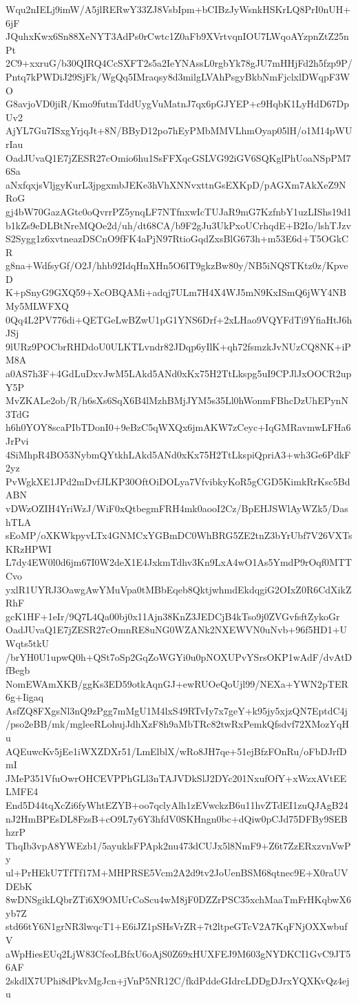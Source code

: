 Wqu2nIELj9imW/A5jlRERwY33ZJ8VsbIpm+bCIBzJyWsnkHSKrLQ8PrI0nUH+6jF
JQuhxKwx6Sn88XeNYT3AdPs0rCwtc1Z0aFb9XVrtvqnIOU7LWqoAYzpnZtZ25nPt
2C9+xxruG/b30QIRQ4CcSXFT2s5a2IeYNAssL0rgbYk78gJU7mHHjFd2h5fzp9P/
Pntq7kPWDiJ29SjFk/WgQq5IMraqsy8d3milgLVAhPsgyBkbNmFjclxlDWqpF3WO
G8avjoVD0jiR/Kmo9futmTddUygVuMatnJ7qx6pGJYEP+c9HqbK1LyHdD67DpUv2
AjYL7Gu7ISxgYrjqJt+8N/BByD12po7hEyPMbMMVLhmOyap05lH/o1M14pWUrIau
OadJUvaQ1E7jZESR27cOmio6hu1SsFFXqcGSLVG92iGV6SQKglPhUoaNSpPM76Sa
aNxfqxjsVljgyKurL3jpgxmbJEKe3hVhXNNvxttnGsEXKpD/pAGXm7AkXeZ9NRoG
gj4bW70GazAGtc0oQvrrPZ5ynqLF7NTfnxwIcTUJaR9mG7KzfnbY1uzLIShs19d1
b1kZs9eDLBtNreMQOe2d/uh/dt68CA/b9F2gJu3UkPxoUCrhqdE+B2Io/lshTJzv
S2Sygg1z6xvtneazDSCnO9fFK4aPjN97RtioGqdZxsBlG673h+m53E6d+T5OGkCR
g8na+WdfsyGf/O2J/hhb92IdqHnXHn5O6IT9gkzBw80y/NB5iNQSTKtz0z/KpveD
K+pSnyG9GXQ59+XcOBQAMi+adqj7ULm7H4X4WJ5mN9KxISmQ6jWY4NBMy5MLWFXQ
0Qq4L2PV776di+QETGeLwBZwU1pG1YNS6Drf+2xLHao9VQYFdTi9YfiaHtJ6hJSj
9lURz9POCbrRHDdoU0ULKTLvndr82JDqp6yIlK+qh72fsmzkJvNUzCQ8NK+iPM8A
a0AS7h3F+4GdLuDxvJwM5LAkd5ANd0xKx75H2TtLkspg5uI9CPJlJxOOCR2upY5P
MvZKALe2ob/R/h6sXs6SqX6B4lMzhBMjJYM5s35Ll0hWonmFBhcDzUhEPynN3TdG
h6h0YOY8scaPIbTDonI0+9eBzC5qWXQx6jmAKW7zCeyc+IqGMRavmwLFHa6JrPvi
4SiMhpR4BO53NybmQYtkhLAkd5ANd0xKx75H2TtLkspiQpriA3+wh3Ge6PdkF2yz
PvWgkXE1JPd2mDvfJLKP30OftOiDOLya7VfvibkyKoR5gCGD5KimkRrKsc5BdABN
vDWzOZIH4YriWzJ/WiF0xQtbegmFRH4mk0aooI2Cz/BpEHJSWlAyWZk5/DashTLA
sEoMP/oXKWkpyvLTx4GNMCxYGBmDC0WhBRG5ZE2tnZ3bYrUbf7V26VXTsKRzHPWI
L7dy4EW0l0d6jm67I0W2deX1E4JxkmTdhv3Kn9LxA4wO1As5YmdP9rOqf0MTTCvo
yxlR1UYRJ3OawgAwYMuVpa0tMBbEqeb8QktjwhmdEkdqgiG2OIxZ0R6CdXikZRhF
gcK1HF+1eIr/9Q7L4Qa00bj0x11Ajn38KnZ3JEDCjB4kTso9j0ZVGvfsftZykoGr
OadJUvaQ1E7jZESR27cOmnRE8uNG0WZANk2NXEWVN0uNvb+96f5HD1+UWqts5tkU
/brYH0U1upwQ0h+QSt7oSp2GqZoWGYi0u0pNOXUPvYSrsOKP1wAdF/dvAtDfBegb
NomEWAmXKB/ggKs3ED59otkAqnGJ+ewRUOeQoUjl99/NEXa+YWN2pTER6g+Iigaq
AsfZQ8FXgsNl3nQ9zPgg7mMgU1M4lxS49RTvIy7x7geY+k95jy5xjzQN7EptdC4j
/pso2eBB/mk/mgleeRLohujJdhXzF8h9aMbTRc82twRxPemkQfsdvf72XMozYqHu
AQEuwcKv5jEe1iWXZDXr51/LmElblX/wRo8JH7qe+51ejBfzFOnRu/oFbDJrfDmI
JMeP351VfuOwrOHCEVPPhGLl3nTAJVDkSlJ2DYc201NxufOfY+xWzxAVtEELMFE4
End5D44tqXcZi6fyWhtEZYB+oo7qclyAlh1zEVwckzB6u11hvZTdEI1zuQJAgB24
nJ2HmBPEsDL8FzsB+cO9L7y6Y3hfdV0SKHngn0bc+dQiw0pCJd75DFBy9SEBhzrP
ThqIb3vpA8YWEzb1/5ayuklsFPApk2nu473dCUJx5l8NmF9+Z6t7ZzERxzvnVwPy
ul+PrHEkU7TfTf17M+MHPRSE5Vcm2A2d9tv2JoUenBSM68qtnec9E+X0raUVDEbK
8wDNSgikLQbrZTi6X9OMUrCoScu4wM8jF0DZZrPSC35xchMaaTmFrHKqbwX6yb7Z
std66tY6N1grNR3lwqcT1+E6iJZ1pSHsVrZR+7t2ltpeGTcV2A7KqFNjOXXwbufV
aWpHiesEUq2LjW83CfeoLBfxU6oAjS0Z69xHUXFEJ9M603gNYDKCI1GvC9JT56AF
2skdlX7UPhi8dPkvMgJcn+jVnP5NR12C/fkdPddeGIdrcLDDgDJrxYQXKvQz4eju

